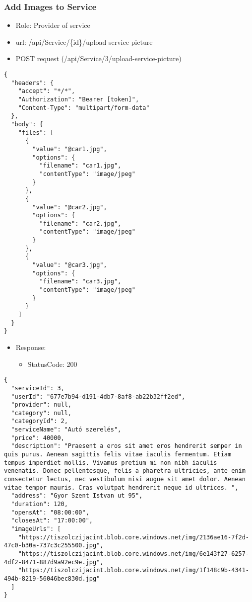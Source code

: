 \documentclass[11pt]{article}
\begin{document}
\subsubsection{Add Images to Service}
\label{sec:org4358162}
\begin{itemize}
\item Role: Provider of service
\item url: /api/Service/\{id\}/upload-service-picture
\item POST request (/api/Service/3/upload-service-picture)
\end{itemize}
\begin{verbatim}
{
  "headers": {
    "accept": "*/*",
    "Authorization": "Bearer [token]",
    "Content-Type": "multipart/form-data"
  },
  "body": {
    "files": [
      {
        "value": "@car1.jpg",
        "options": {
          "filename": "car1.jpg",
          "contentType": "image/jpeg"
        }
      },
      {
        "value": "@car2.jpg",
        "options": {
          "filename": "car2.jpg",
          "contentType": "image/jpeg"
        }
      },
      {
        "value": "@car3.jpg",
        "options": {
          "filename": "car3.jpg",
          "contentType": "image/jpeg"
        }
      }
    ]
  }
}

\end{verbatim}
\begin{itemize}
\item Response:
\begin{itemize}
\item StatusCode: 200
\end{itemize}
\end{itemize}
\begin{verbatim}
{
  "serviceId": 3,
  "userId": "677e7b94-d191-4db7-8af8-ab22b32ff2ed",
  "provider": null,
  "category": null,
  "categoryId": 2,
  "serviceName": "Autó szerelés",
  "price": 40000,
  "description": "Praesent a eros sit amet eros hendrerit semper in quis purus. Aenean sagittis felis vitae iaculis fermentum. Etiam tempus imperdiet mollis. Vivamus pretium mi non nibh iaculis venenatis. Donec pellentesque, felis a pharetra ultricies, ante enim consectetur lectus, nec vestibulum nisi augue sit amet dolor. Aenean vitae tempor mauris. Cras volutpat hendrerit neque id ultrices. ",
  "address": "Gyor Szent Istvan ut 95",
  "duration": 120,
  "opensAt": "08:00:00",
  "closesAt": "17:00:00",
  "imageUrls": [
    "https://tiszolczijacint.blob.core.windows.net/img/2136ae16-7f2d-47c0-b30a-737c3c255500.jpg",
    "https://tiszolczijacint.blob.core.windows.net/img/6e143f27-6257-4df2-8471-887d9a92ec9e.jpg",
    "https://tiszolczijacint.blob.core.windows.net/img/1f148c9b-4341-494b-8219-56046bec830d.jpg"
  ]
}
\end{verbatim}
\end{document}
